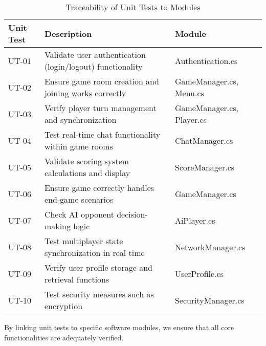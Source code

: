 \documentclass[12pt, titlepage]{article}
\begin{document}
\begin{table}[h]
    \centering
    \begin{tabularx}{\textwidth}{|l|X|l|}
        \hline
        \textbf{Unit Test} & \textbf{Description} & \textbf{Module} \\
        \hline
        UT-01 & Validate user authentication (login/logout) functionality & Authentication.cs \\
        UT-02 & Ensure game room creation and joining works correctly & GameManager.cs, Menu.cs \\
        UT-03 & Verify player turn management and synchronization & GameManager.cs, Player.cs \\
        UT-04 & Test real-time chat functionality within game rooms & ChatManager.cs \\
        UT-05 & Validate scoring system calculations and display & ScoreManager.cs \\
        UT-06 & Ensure game correctly handles end-game scenarios & GameManager.cs \\
        UT-07 & Check AI opponent decision-making logic & AiPlayer.cs \\
        UT-08 & Test multiplayer state synchronization in real time & NetworkManager.cs \\
        UT-09 & Verify user profile storage and retrieval functions & UserProfile.cs \\
        UT-10 & Test security measures such as encryption & SecurityManager.cs \\
        \hline
    \end{tabularx}
    \caption{Traceability of Unit Tests to Modules}
    \label{tab:trace_modules}
\end{table}

By linking unit tests to specific software modules, we ensure that all core functionalities are adequately verified.
\end{document}
